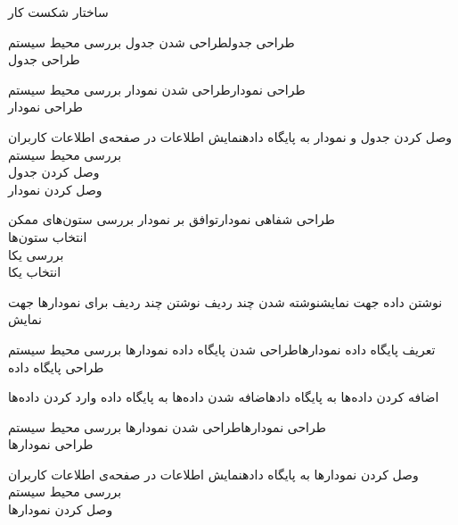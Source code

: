 \begin{wbsbox}{ساختار شکست کار}
\begin{wbssub}{طراحی جدول}{طراحی شدن جدول}
\task بررسی محیط سیستم  \\
\task طراحی جدول
\end{wbssub}

\begin{wbssub}{طراحی نمودار}{طراحی شدن نمودار}
\task بررسی محیط سیستم  \\
\task طراحی نمودار
\end{wbssub}

\begin{wbssub}{وصل کردن جدول و نمودار به پایگاه داده}{نمایش اطلاعات در صفحه‌ی اطلاعات کاربران}
\task بررسی محیط سیستم  \\
\task وصل کردن جدول \\
\task وصل کردن نمودار
\end{wbssub}

\begin{wbssub}{طراحی شفاهی نمودار}{توافق بر نمودار}
\task بررسی ستون‌های ممکن \\
\task انتخاب ستون‌ها \\
\task بررسی یکا \\
\task انتخاب یکا
\end{wbssub}

\begin{wbssub}{نوشتن داده جهت نمایش}{نوشته شدن چند ردیف}
\task نوشتن چند ردیف برای نمودارها جهت نمایش
\end{wbssub}

\begin{wbssub}{تعریف پایگاه داده نمودارها}{طراحی شدن پایگاه داده نمودارها}
\task بررسی محیط سیستم  \\
\task طراحی پایگاه داده
\end{wbssub}

\begin{wbssub}{اضافه کردن داده‌ها به پایگاه داده}{اضافه شدن داده‌ها به پایگاه داده}
\task وارد کردن داده‌ها
\end{wbssub}

\begin{wbssub}{طراحی نمودارها}{طراحی شدن نمودارها}
\task بررسی محیط سیستم  \\
\task طراحی نمودار‌ها
\end{wbssub}

\begin{wbssub}{وصل کردن نمودارها به پایگاه داده}{نمایش اطلاعات در صفحه‌ی اطلاعات کاربران}
\task بررسی محیط سیستم  \\
\task وصل کردن نمودارها
\end{wbssub}


\end{wbsbox}

